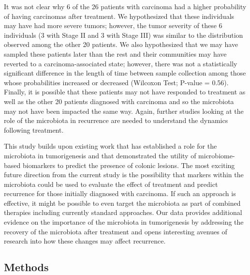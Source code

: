 \documentclass[12pt,]{article}
\begin{document}
It was not clear why 6 of the 26 patients with carcinoma had a higher
probability of having carcinomas after treatment. We hypothesized that
these individuals may have had more severe tumors; however, the tumor
severity of these 6 individuals (3 with Stage II and 3 with Stage III)
was similar to the distribution observed among the other 20 patients. We
also hypothesized that we may have sampled these patients later than the
rest and their communities may have reverted to a carcinoma-associated
state; however, there was not a statistically significant difference in
the length of time between sample collection among those whose
probabilities increased or decreased (Wilcoxon Test; P-value = 0.56).
Finally, it is possible that these patients may not have responded to
treatment as well as the other 20 patients diagnosed with carcinoma and
so the microbiota may not have been impacted the same way. Again,
further studies looking at the role of the microbiota in recurrence are
needed to understand the dynamics following treatment.

This study builds upon existing work that has established a role for the
microbiota in tumorigenesis and that demonstrated the utility of
microbiome-based biomarkers to predict the presence of colonic lesions.
The most exciting future direction from the current study is the
possibility that markers within the microbiota could be used to evaluate
the effect of treatment and predict recurrence for those initially
diagnosed with carcinoma. If such an approach is effective, it might be
possible to even target the microbiota as part of combined therapies
including currently standard approaches. Our data provides additional
evidence on the importance of the microbiota in tumorigenesis by
addressing the recovery of the microbiota after treatment and opens
interesting avenues of research into how these changes may affect
recurrence.

\newpage

\subsection{Methods}\label{methods}
\end{document}
